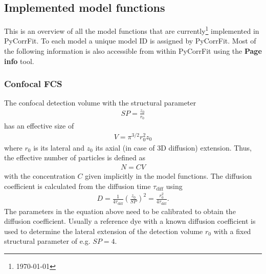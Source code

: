 \subsection{Implemented model functions}
\label{sec:mdls}
This is an overview of all the model functions that are currently\footnote{\today} implemented in PyCorrFit. To each model a unique model ID is assigned by PyCorrFit. Most of the following information is also accessible from within PyCorrFit using the \textbf{Page info} tool.

\subsubsection{Confocal FCS}
The confocal detection volume with the structural parameter 
\begin{align}
\mathit{SP}= \frac{z_0}{r_0}
\end{align}
has an effective size of
\begin{align}
V = \pi^{3/2} r_0^2 z_0
\end{align}
where $r_0$ is its lateral and $z_0$ its axial (in case of 3D diffusion) extension. Thus, the effective number of particles is defined as
\begin{align}
N = C V
\end{align}
with the concentration $C$ given implicitly in the model functions.
The diffusion coefficient is calculated from the diffusion time $\tau_\mathrm{diff}$ using
\begin{align}
D = \frac{1}{4 \tau_\mathrm{diff}} \left( \frac{z_0}{\mathit{SP}} \right)^2 = \frac{r_0^2}{4 \tau_\mathrm{diff}}.
\end{align}
The parameters in the equation above need to be calibrated to obtain the diffusion coefficient. Usually a reference dye with a known diffusion coefficient is used to determine the lateral extension of the detection volume $r_0$ with a fixed structural parameter of e.g. $\mathit{SP}=4$.\\
\vspace{2em}


